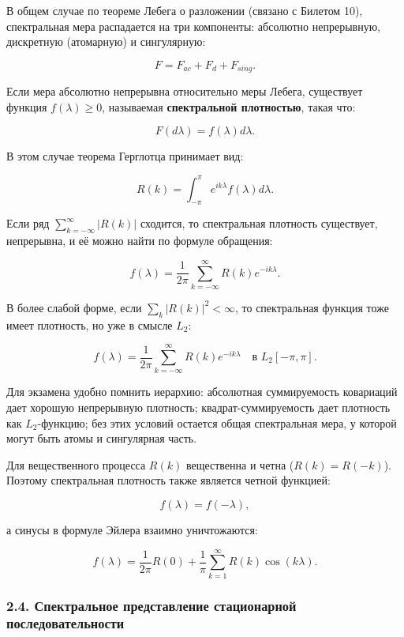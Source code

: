 \documentclass[
  11pt,
  a4paper,
]{article}
\begin{document}
В общем случае по теореме Лебега о разложении (связано с Билетом 10),
спектральная мера распадается на три компоненты: абсолютно непрерывную,
дискретную (атомарную) и сингулярную:

\[
F = F_{ac} + F_d + F_{sing}.
\]

Если мера абсолютно непрерывна относительно меры Лебега, существует
функция \(f(\lambda) \ge 0\), называемая \textbf{спектральной
плотностью}, такая что:

\[
F(d\lambda) = f(\lambda) d\lambda.
\]

В этом случае теорема Герглотца принимает вид:

\[
R(k) = \int_{-\pi}^{\pi} e^{i k \lambda} f(\lambda) d\lambda.
\]

Если ряд \(\sum_{k=-\infty}^{\infty} |R(k)|\) сходится, то спектральная
плотность существует, непрерывна, и её можно найти по формуле обращения:

\[
f(\lambda) = \frac{1}{2\pi} \sum_{k=-\infty}^{\infty} R(k) e^{-i k \lambda}.
\]

В более слабой форме, если \(\sum_k |R(k)|^2<\infty\), то спектральная
функция тоже имеет плотность, но уже в смысле \(L_2\):

\[
f(\lambda)=\frac1{2\pi}\sum_{k=-\infty}^{\infty}R(k)e^{-ik\lambda}
\quad \text{в } L_2[-\pi,\pi].
\]

Для экзамена удобно помнить иерархию: абсолютная суммируемость
ковариаций дает хорошую непрерывную плотность; квадрат-суммируемость
дает плотность как \(L_2\)-функцию; без этих условий остается общая
спектральная мера, у которой могут быть атомы и сингулярная часть.

Для вещественного процесса \(R(k)\) вещественна и четна
(\(R(k) = R(-k)\)). Поэтому спектральная плотность также является четной
функцией:

\[
f(\lambda) = f(-\lambda),
\]

а синусы в формуле Эйлера взаимно уничтожаются:

\[
f(\lambda) = \frac{1}{2\pi} R(0) + \frac{1}{\pi} \sum_{k=1}^{\infty} R(k) \cos(k \lambda).
\]

\subsubsection{2.4. Спектральное представление стационарной
последовательности}\label{ux441ux43fux435ux43aux442ux440ux430ux43bux44cux43dux43eux435-ux43fux440ux435ux434ux441ux442ux430ux432ux43bux435ux43dux438ux435-ux441ux442ux430ux446ux438ux43eux43dux430ux440ux43dux43eux439-ux43fux43eux441ux43bux435ux434ux43eux432ux430ux442ux435ux43bux44cux43dux43eux441ux442ux438}
\end{document}

